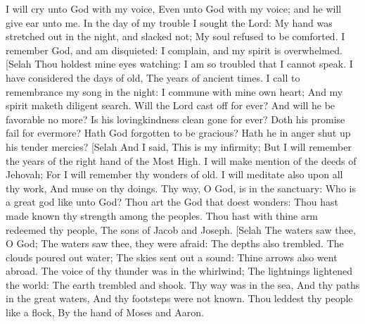 I will cry unto God with my voice, Even unto God with my voice; and he will give ear unto me.  In the day of my trouble I sought the Lord: My hand was stretched out in the night, and slacked not; My soul refused to be comforted.  I remember God, and am disquieted: I complain, and my spirit is overwhelmed. [Selah  Thou holdest mine eyes watching: I am so troubled that I cannot speak.  I have considered the days of old, The years of ancient times.  I call to remembrance my song in the night: I commune with mine own heart; And my spirit maketh diligent search.  Will the Lord cast off for ever? And will he be favorable no more?  Is his lovingkindness clean gone for ever? Doth his promise fail for evermore?  Hath God forgotten to be gracious? Hath he in anger shut up his tender mercies? [Selah  And I said, This is my infirmity; But I will remember the years of the right hand of the Most High.  I will make mention of the deeds of Jehovah; For I will remember thy wonders of old.  I will meditate also upon all thy work, And muse on thy doings.  Thy way, O God, is in the sanctuary: Who is a great god like unto God?  Thou art the God that doest wonders: Thou hast made known thy strength among the peoples.  Thou hast with thine arm redeemed thy people, The sons of Jacob and Joseph. [Selah  The waters saw thee, O God; The waters saw thee, they were afraid: The depths also trembled.  The clouds poured out water; The skies sent out a sound: Thine arrows also went abroad.  The voice of thy thunder was in the whirlwind; The lightnings lightened the world: The earth trembled and shook.  Thy way was in the sea, And thy paths in the great waters, And thy footsteps were not known.  Thou leddest thy people like a flock, By the hand of Moses and Aaron. 

